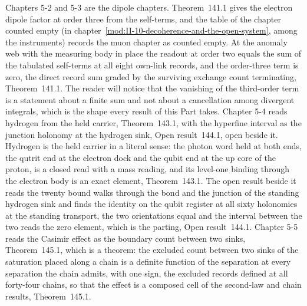 Chapters 5-2 and 5-3 are the dipole chapters. Theorem~141.1 gives the electron dipole factor at order three from the self-terms, and the table of the chapter counted empty (in chapter~\ref{mod:II-10-decoherence-and-the-open-system}, among the instruments) records the muon chapter as counted empty. At the anomaly web with the measuring body in place the readout at order two equals the sum of the tabulated self-terms at all eight own-link records, and the order-three term is zero, the direct record sum graded by the surviving exchange count terminating, Theorem~141.1. The reader will notice that the vanishing of the third-order term is a statement about a finite sum and not about a cancellation among divergent integrals, which is the shape every result of this Part takes. Chapter 5-4 reads hydrogen from the held carrier, Theorem~143.1, with the hyperfine interval as the junction holonomy at the hydrogen sink, Open result~144.1, open beside it. Hydrogen is the held carrier in a literal sense: the photon word held at both ends, the qutrit end at the electron dock and the qubit end at the up core of the proton, is a closed read with a mass reading, and its level-one binding through the electron body is an exact element, Theorem~143.1. The open result beside it reads the twenty bound walks through the bond and the junction of the standing hydrogen sink and finds the identity on the qubit register at all sixty holonomies at the standing transport, the two orientations equal and the interval between the two reads the zero element, which is the parting, Open result~144.1. Chapter 5-5 reads the Casimir effect as the boundary count between two sinks, Theorem~145.1, which is a theorem: the excluded count between two sinks of the saturation placed along a chain is a definite function of the separation at every separation the chain admits, with one sign, the excluded records defined at all forty-four chains, so that the effect is a composed cell of the second-law and chain results, Theorem~145.1.

